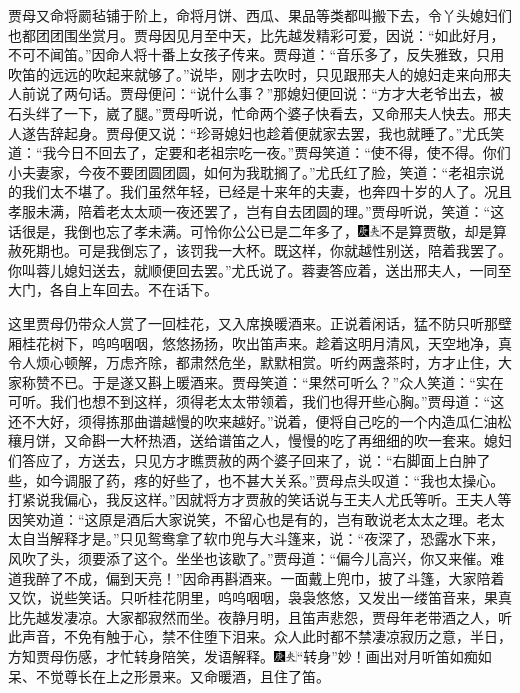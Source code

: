贾母又命将罽毡铺于阶上，命将月饼、西瓜、果品等类都叫搬下去，令丫头媳妇们也都团团围坐赏月。贾母因见月至中天，比先越发精彩可爱，因说：“如此好月，不可不闻笛。”因命人将十番上女孩子传来。贾母道：“音乐多了，反失雅致，只用吹笛的远远的吹起来就够了。”说毕，刚才去吹时，只见跟邢夫人的媳妇走来向邢夫人前说了两句话。贾母便问：“说什么事？”那媳妇便回说：“方才大老爷出去，被石头绊了一下，崴了腿。”贾母听说，忙命两个婆子快看去，又命邢夫人快去。邢夫人遂告辞起身。贾母便又说：“珍哥媳妇也趁着便就家去罢，我也就睡了。”尤氏笑道：“我今日不回去了，定要和老祖宗吃一夜。”贾母笑道：“使不得，使不得。你们小夫妻家，今夜不要团圆团圆，如何为我耽搁了。”尤氏红了脸，笑道：“老祖宗说的我们太不堪了。我们虽然年轻，已经是十来年的夫妻，也奔四十岁的人了。况且孝服未满，陪着老太太顽一夜还罢了，岂有自去团圆的理。”贾母听说，笑道：“这话很是，我倒也忘了孝未满。可怜你公公已是二年多了，{\includegraphics[width=3mm]{../Images/00004}\includegraphics[width=3mm]{../Images/00012}\footnotesize \kaishu 不是算贾敬，却是算赦死期也。}可是我倒忘了，该罚我一大杯。既这样，你就越性别送，陪着我罢了。你叫蓉儿媳妇送去，就顺便回去罢。”尤氏说了。蓉妻答应着，送出邢夫人，一同至大门，各自上车回去。不在话下。

这里贾母仍带众人赏了一回桂花，又入席换暖酒来。正说着闲话，猛不防只听那壁厢桂花树下，呜呜咽咽，悠悠扬扬，吹出笛声来。趁着这明月清风，天空地净，真令人烦心顿解，万虑齐除，都肃然危坐，默默相赏。听约两盏茶时，方才止住，大家称赞不已。于是遂又斟上暖酒来。贾母笑道：“果然可听么？”众人笑道：“实在可听。我们也想不到这样，须得老太太带领着，我们也得开些心胸。”贾母道：“这还不大好，须得拣那曲谱越慢的吹来越好。”说着，便将自己吃的一个内造瓜仁油松穰月饼，又命斟一大杯热酒，送给谱笛之人，慢慢的吃了再细细的吹一套来。媳妇们答应了，方送去，只见方才瞧贾赦的两个婆子回来了，说：“右脚面上白肿了些，如今调服了药，疼的好些了，也不甚大关系。”贾母点头叹道：“我也太操心。打紧说我偏心，我反这样。”因就将方才贾赦的笑话说与王夫人尤氏等听。王夫人等因笑劝道：“这原是酒后大家说笑，不留心也是有的，岂有敢说老太太之理。老太太自当解释才是。”只见鸳鸯拿了软巾兜与大斗篷来，说：“夜深了，恐露水下来，风吹了头，须要添了这个。坐坐也该歇了。”贾母道：“偏今儿高兴，你又来催。难道我醉了不成，偏到天亮！”因命再斟酒来。一面戴上兜巾，披了斗篷，大家陪着又饮，说些笑话。只听桂花阴里，呜呜咽咽，袅袅悠悠，又发出一缕笛音来，果真比先越发凄凉。大家都寂然而坐。夜静月明，且笛声悲怨，贾母年老带酒之人，听此声音，不免有触于心，禁不住堕下泪来。众人此时都不禁凄凉寂历之意，半日，方知贾母伤感，才忙转身陪笑，发语解释。{\includegraphics[width=3mm]{../Images/00004}\includegraphics[width=3mm]{../Images/00012}\footnotesize \kaishu “转身”妙！画出对月听笛如痴如呆、不觉尊长在上之形景来。}又命暖酒，且住了笛。

